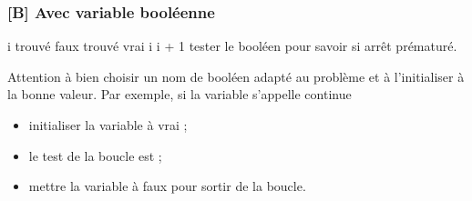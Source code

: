 			\subsubsection*{[B] Avec variable booléenne}
			
				\begin{LDA}
					\Let i 
					\Let trouvé \Gets faux
							\Let trouvé \Gets vrai
						\Else
							\Let i \Gets i + 1
						\EndIf
					\EndWhile
					\LComment tester le booléen pour savoir si arrêt prématuré.
				\end{LDA}
				
				Attention à bien choisir un nom de booléen 
				adapté au problème
				et à l'initialiser à la bonne valeur. 
				Par exemple, si la variable s'appelle \og{}continue\fg{}
				\begin{itemize}
				\item initialiser la variable à vrai ;
				\item le test de la boucle est \og{}\fg{} ;
				\item mettre la variable à faux pour sortir de la boucle.
				\end{itemize}
		
	
